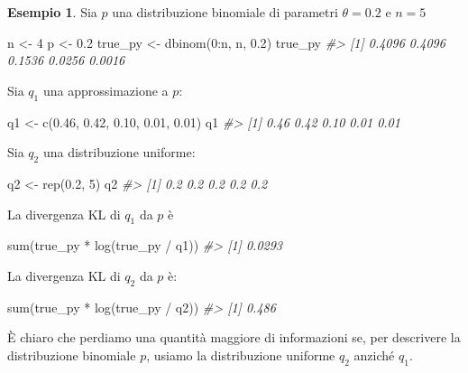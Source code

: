 \documentclass[
  10pt,
  italian,
  a4paper,
  extrafontsizes,onecolumn,openright
  ]{memoir}
\newenvironment{Shaded}{\begin{snugshade}}{\end{snugshade}}
\newcommand{\CommentTok}[1]{\textcolor[rgb]{0.56,0.35,0.01}{\textit{#1}}}
\newcommand{\DecValTok}[1]{\textcolor[rgb]{0.00,0.00,0.81}{#1}}
\newcommand{\FloatTok}[1]{\textcolor[rgb]{0.00,0.00,0.81}{#1}}
\newcommand{\FunctionTok}[1]{\textcolor[rgb]{0.00,0.00,0.00}{#1}}
\newcommand{\NormalTok}[1]{#1}
\newcommand{\OtherTok}[1]{\textcolor[rgb]{0.56,0.35,0.01}{#1}}
\newcommand{\SpecialCharTok}[1]{\textcolor[rgb]{0.00,0.00,0.00}{#1}}
\theoremstyle{definition}
\theoremstyle{definition}
\newtheorem{example}{Esempio}[chapter]
\theoremstyle{definition}
\theoremstyle{definition}
\theoremstyle{remark}
\begin{document}
\begin{example}
Sia \(p\) una distribuzione binomiale di parametri \(\theta = 0.2\) e \(n = 5\)

\begin{Shaded}
\begin{Highlighting}[]
\NormalTok{n }\OtherTok{\textless{}{-}} \DecValTok{4}
\NormalTok{p }\OtherTok{\textless{}{-}} \FloatTok{0.2}
\NormalTok{true\_py }\OtherTok{\textless{}{-}} \FunctionTok{dbinom}\NormalTok{(}\DecValTok{0}\SpecialCharTok{:}\NormalTok{n, n, }\FloatTok{0.2}\NormalTok{)}
\NormalTok{true\_py}
\CommentTok{\#\textgreater{} [1] 0.4096 0.4096 0.1536 0.0256 0.0016}
\end{Highlighting}
\end{Shaded}

\noindent
Sia \(q_1\) una approssimazione a \(p\):

\begin{Shaded}
\begin{Highlighting}[]
\NormalTok{q1 }\OtherTok{\textless{}{-}} \FunctionTok{c}\NormalTok{(}\FloatTok{0.46}\NormalTok{, }\FloatTok{0.42}\NormalTok{, }\FloatTok{0.10}\NormalTok{, }\FloatTok{0.01}\NormalTok{, }\FloatTok{0.01}\NormalTok{)}
\NormalTok{q1}
\CommentTok{\#\textgreater{} [1] 0.46 0.42 0.10 0.01 0.01}
\end{Highlighting}
\end{Shaded}

\noindent
Sia \(q_2\) una distribuzione uniforme:

\begin{Shaded}
\begin{Highlighting}[]
\NormalTok{q2 }\OtherTok{\textless{}{-}} \FunctionTok{rep}\NormalTok{(}\FloatTok{0.2}\NormalTok{, }\DecValTok{5}\NormalTok{)}
\NormalTok{q2}
\CommentTok{\#\textgreater{} [1] 0.2 0.2 0.2 0.2 0.2}
\end{Highlighting}
\end{Shaded}

\noindent
La divergenza KL di \(q_1\) da \(p\) è

\begin{Shaded}
\begin{Highlighting}[]
\FunctionTok{sum}\NormalTok{(true\_py }\SpecialCharTok{*} \FunctionTok{log}\NormalTok{(true\_py }\SpecialCharTok{/}\NormalTok{ q1))}
\CommentTok{\#\textgreater{} [1] 0.0293}
\end{Highlighting}
\end{Shaded}

\noindent
La divergenza KL di \(q_2\) da \(p\) è:

\begin{Shaded}
\begin{Highlighting}[]
\FunctionTok{sum}\NormalTok{(true\_py }\SpecialCharTok{*} \FunctionTok{log}\NormalTok{(true\_py }\SpecialCharTok{/}\NormalTok{ q2))}
\CommentTok{\#\textgreater{} [1] 0.486}
\end{Highlighting}
\end{Shaded}

\noindent
È chiaro che perdiamo una quantità maggiore di informazioni se, per descrivere la distribuzione binomiale \(p\), usiamo la distribuzione uniforme \(q_2\) anziché \(q_1\).
\end{example}
\end{document}
